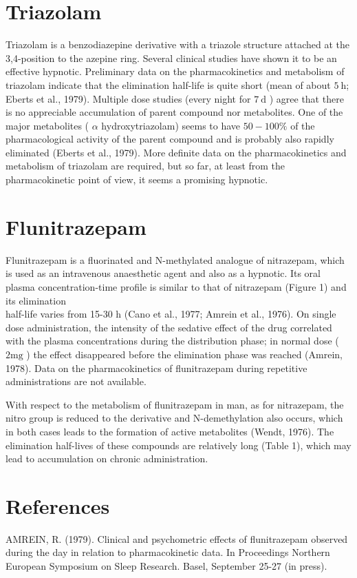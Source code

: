\documentclass[10pt]{article}
\begin{document}
\section*{Triazolam}
Triazolam is a benzodiazepine derivative with a triazole structure attached at the 3,4-position to the azepine ring. Several clinical studies have shown it to be an effective hypnotic. Preliminary data on the pharmacokinetics and metabolism of triazolam indicate that the elimination half-life is quite short (mean of about $5 \mathrm{~h}$; Eberts et al., 1979). Multiple dose studies (every night for $7 \mathrm{~d}$ ) agree that there is no appreciable accumulation of parent compound nor metabolites. One of the major metabolites ( $\alpha$ hydroxytriazolam) seems to have $50-100 \%$ of the pharmacological activity of the parent compound and is probably also rapidly eliminated (Eberts et al., 1979). More definite data on the pharmacokinetics and metabolism of triazolam are required, but so far, at least from the pharmacokinetic point of view, it seems a promising hypnotic.

\section*{Flunitrazepam}
Flunitrazepam is a fluorinated and $\mathrm{N}$-methylated analogue of nitrazepam, which is used as an intravenous anaesthetic agent and also as a hypnotic. Its oral plasma concentration-time profile is similar to that of nitrazepam (Figure 1) and its elimination\\
half-life varies from 15-30 h (Cano et al., 1977; Amrein et al., 1976). On single dose administration, the intensity of the sedative effect of the drug correlated with the plasma concentrations during the distribution phase; in normal dose ( $2 \mathrm{mg}$ ) the effect disappeared before the elimination phase was reached (Amrein, 1978). Data on the pharmacokinetics of flunitrazepam during repetitive administrations are not available.

With respect to the metabolism of flunitrazepam in man, as for nitrazepam, the nitro group is reduced to the derivative and $\mathrm{N}$-demethylation also occurs, which in both cases leads to the formation of active metabolites (Wendt, 1976). The elimination half-lives of these compounds are relatively long (Table 1), which may lead to accumulation on chronic administration.

\section*{References}
AMREIN, R. (1979). Clinical and psychometric effects of flunitrazepam observed during the day in relation to pharmacokinetic data. In Proceedings Northern European Symposium on Sleep Research. Basel, September 25-27 (in press).
\end{document}
